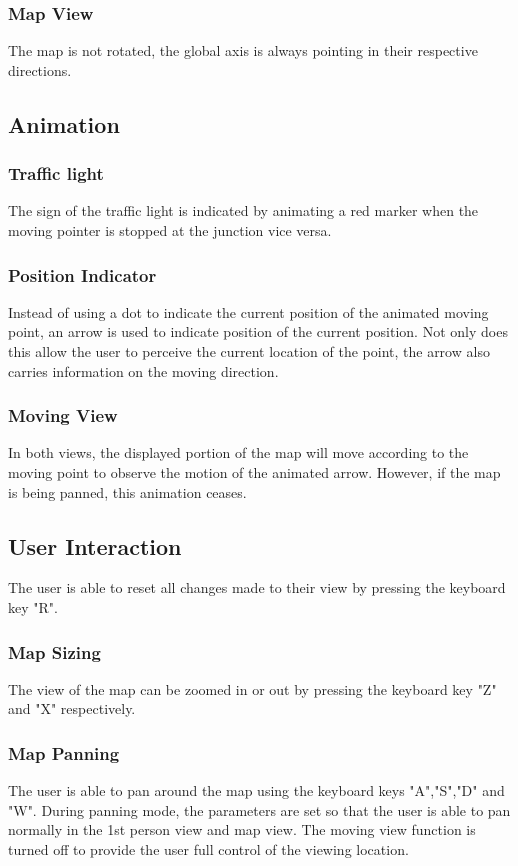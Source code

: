 \documentclass[12pt]{article}
\begin{document}
\subsubsection{Map View}
The map is not rotated, the global axis is always pointing in their respective directions.
\subsection{Animation}
\subsubsection{Traffic light}
The sign of the traffic light is indicated by animating a red marker when the moving pointer is stopped at the junction vice versa.
\subsubsection{Position Indicator}
Instead of using a dot to indicate the current position of the animated moving point, an arrow is used to indicate position of the current position. Not only does this allow the user to perceive the current location of the point, the arrow also carries information on the moving direction.
\subsubsection{Moving View}
In both views, the displayed portion of the map will move according to the moving point to observe the motion of the animated arrow. However, if the map is being panned, this animation ceases.
\subsection{User Interaction}
The user is able to reset all changes made to their view by pressing the keyboard key "R".
\subsubsection{Map Sizing}
The view of the map can be zoomed in or out by pressing the keyboard key "Z" and "X" respectively.
\subsubsection{Map Panning}
The user is able to pan around the map using the keyboard keys "A","S","D" and "W". During panning mode, the parameters are set so that the user is able to pan normally in the 1st person view and map view. The moving view function is turned off to provide the user full control of the viewing location.
\end{document}
